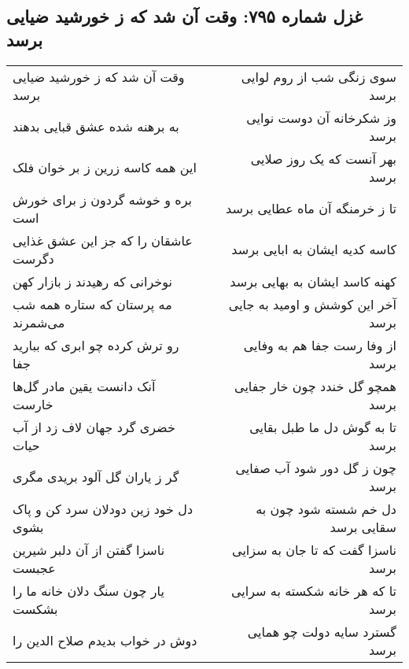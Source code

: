 \begin{center}
\section*{غزل شماره ۷۹۵: وقت آن شد که ز خورشید ضیایی برسد}
\label{sec:0795}
\begin{longtable}{l p{0.5cm} r}
وقت آن شد که ز خورشید ضیایی برسد
&&
سوی زنگی شب از روم لوایی برسد
\\
به برهنه شده عشق قبایی بدهند
&&
وز شکرخانه آن دوست نوایی برسد
\\
این همه کاسه زرین ز بر خوان فلک
&&
بهر آنست که یک روز صلایی برسد
\\
بره و خوشه گردون ز برای خورش است
&&
تا ز خرمنگه آن ماه عطایی برسد
\\
عاشقان را که جز این عشق غذایی دگرست
&&
کاسه کدیه ایشان به ابایی برسد
\\
نوخرانی که رهیدند ز بازار کهن
&&
کهنه کاسد ایشان به بهایی برسد
\\
مه پرستان که ستاره همه شب می‌شمرند
&&
آخر این کوشش و اومید به جایی برسد
\\
رو ترش کرده چو ابری که ببارید جفا
&&
از وفا رست جفا هم به وفایی برسد
\\
آنک دانست یقین مادر گل‌ها خارست
&&
همچو گل خندد چون خار جفایی برسد
\\
خضری گرد جهان لاف زد از آب حیات
&&
تا به گوش دل ما طبل بقایی برسد
\\
گر ز یاران گل آلود بریدی مگری
&&
چون ز گل دور شود آب صفایی برسد
\\
دل خود زین دودلان سرد کن و پاک بشوی
&&
دل خم شسته شود چون به سقایی برسد
\\
ناسزا گفتن از آن دلبر شیرین عجبست
&&
ناسزا گفت که تا جان به سزایی برسد
\\
یار چون سنگ دلان خانه ما را بشکست
&&
تا که هر خانه شکسته به سرایی برسد
\\
دوش در خواب بدیدم صلاح الدین را
&&
گسترد سایه دولت چو همایی برسد
\\
\end{longtable}
\end{center}
